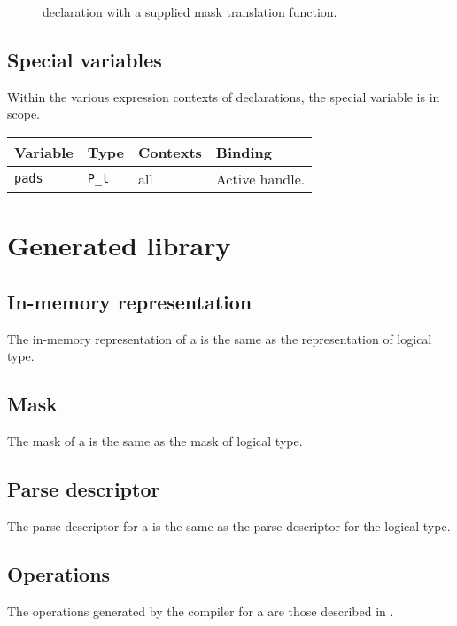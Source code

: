 \begin{figure}
\caption{\Ptrans{} declaration with a supplied mask translation function.}
\label{fig:trans-hex32withMask}
\end{figure}



\subsection{Special variables}
\label{sec:trans-special-variables}
Within the various expression contexts of \Ptrans{} declarations, 
the special variable  is in scope.

\myvskip{1ex}
\begin{center}
\begin{tabular}{|l|l|l|l|}
\hline
Variable & Type & Contexts & Binding \\\hline \hline
\texttt{pads}  & \texttt{P\_t}     & all & Active \pads{} handle. \\ \hline
\end{tabular}
\end{center}
\myvskip{1ex}


\section{Generated library}
\subsection{In-memory representation}
\label{sec:trans-rep}
The in-memory representation of a \ptrans{} is the same as the
representation of logical type.

\subsection{Mask}
\label{sec:trans-masks}
The mask of a \ptrans{} is the same as the
mask of logical type.

\subsection{Parse descriptor}
\label{sec:trans-parse-descriptors}
The parse descriptor for a \Ptrans{} is the same as the parse
descriptor for the logical type.

\subsection{Operations}
The operations generated by the \pads{} compiler for a \Ptrans{} are
those described in .


